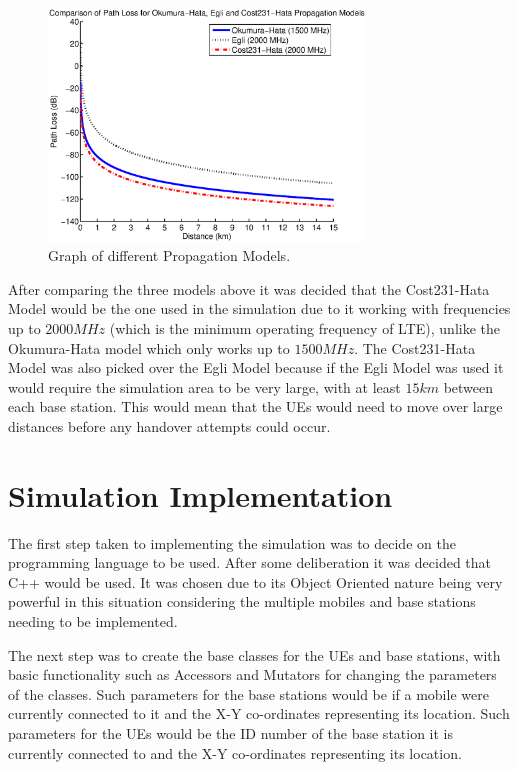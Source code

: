 \begin{figure}[H]
  \begin{center}
    	  \includegraphics[width=0.75\textwidth]{figures/simulation/prop.eps}
    \end{center}
    \caption{Graph of different Propagation Models.}
    \label{fig:prop}
\end{figure}
After comparing the three models above it was decided that the Cost231-Hata Model would be the one used in the simulation due to it working with frequencies up to $2000 MHz$ (which is the minimum operating frequency of LTE), unlike the Okumura-Hata model which only works up to $1500 MHz$. The Cost231-Hata Model was also picked over the Egli Model because if the Egli Model was used it would require the simulation area to be very large, with at least $15 km$ between each base station. This would mean that the UEs would need to move over large distances before any handover attempts could occur.~\cite{chebil2011comparison, shabbir2011comparison}

\section{Simulation Implementation}
The first step taken to implementing the simulation was to decide on the programming language to be used. After some deliberation it was decided that C++ would be used. It was chosen due to its Object Oriented nature being very powerful in this situation considering the multiple mobiles and base stations needing to be implemented.

The next step was to create the base classes for the UEs and base stations, with basic functionality such as Accessors and Mutators for changing the parameters of the classes. Such parameters for the base stations would be if a mobile were currently connected to it and the X-Y co-ordinates representing its location. Such parameters for the UEs would be the ID number of the base station it is currently connected to and the X-Y co-ordinates representing its location.

